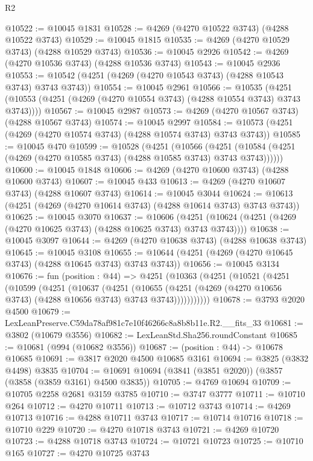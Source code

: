 \begin{lexlean}{R2}
\begin{coremodule}
@10522 := @10045 @1831
@10528 := @4269 (@4270 @10522 @3743) (@4288 @10522 @3743)
@10529 := @10045 @1815
@10535 := @4269 (@4270 @10529 @3743) (@4288 @10529 @3743)
@10536 := @10045 @2926
@10542 := @4269 (@4270 @10536 @3743) (@4288 @10536 @3743)
@10543 := @10045 @2936
@10553 := @10542 (@4251 (@4269 (@4270 @10543 @3743) (@4288 @10543 @3743) @3743 @3743))
@10554 := @10045 @2961
@10566 := @10535
    (@4251 (@10553 (@4251 (@4269 (@4270 @10554 @3743) (@4288 @10554 @3743) @3743 @3743))))
@10567 := @10045 @2987
@10573 := @4269 (@4270 @10567 @3743) (@4288 @10567 @3743)
@10574 := @10045 @2997
@10584 := @10573 (@4251 (@4269 (@4270 @10574 @3743) (@4288 @10574 @3743) @3743 @3743))
@10585 := @10045 @470
@10599 := @10528
    (@4251
      (@10566
        (@4251 (@10584 (@4251 (@4269 (@4270 @10585 @3743) (@4288 @10585 @3743) @3743 @3743))))))
@10600 := @10045 @1848
@10606 := @4269 (@4270 @10600 @3743) (@4288 @10600 @3743)
@10607 := @10045 @433
@10613 := @4269 (@4270 @10607 @3743) (@4288 @10607 @3743)
@10614 := @10045 @3044
@10624 := @10613 (@4251 (@4269 (@4270 @10614 @3743) (@4288 @10614 @3743) @3743 @3743))
@10625 := @10045 @3070
@10637 := @10606
    (@4251 (@10624 (@4251 (@4269 (@4270 @10625 @3743) (@4288 @10625 @3743) @3743 @3743))))
@10638 := @10045 @3097
@10644 := @4269 (@4270 @10638 @3743) (@4288 @10638 @3743)
@10645 := @10045 @3108
@10655 := @10644 (@4251 (@4269 (@4270 @10645 @3743) (@4288 @10645 @3743) @3743 @3743))
@10656 := @10045 @3134
@10676 := fun (position : @44) =>
  @4251
    (@10363
      (@4251
        (@10521
          (@4251
            (@10599
              (@4251
                (@10637
                  (@4251
                    (@10655
                      (@4251 (@4269 (@4270 @10656 @3743) (@4288 @10656 @3743) @3743 @3743)))))))))))
@10678 := @3793 @2020 @4500
@10679 := LexLeanPreserve.C59da78af981c7e10f46266c8a8b8b11e.R2.__fits_33
@10681 := @3802 (@10679 @3556)
@10682 := LexLeanStd.Sha256.roundConstant
@10685 := @10681 (@994 (@10682 @3556))
@10687 := (position : @44) -> @10678 @10685
@10691 := @3817 @2020 @4500 @10685 @3161
@10694 := @3825 (@3832 @4498) @3835
@10704 := @10691 @10694 (@3841 (@3851 @2020)) (@3857 (@3858 (@3859 @3161) @4500 @3835))
@10705 := @4769 @10694
@10709 := @10705 @2258 @2681 @3159 @3785
@10710 := @3747 @3777
@10711 := @10710 @264
@10712 := @4270 @10711
@10713 := @10712 @3743
@10714 := @4269 @10713
@10716 := @4288 @10711 @3743
@10717 := @10714 @10716
@10718 := @10710 @229
@10720 := @4270 @10718 @3743
@10721 := @4269 @10720
@10723 := @4288 @10718 @3743
@10724 := @10721 @10723
@10725 := @10710 @165
@10727 := @4270 @10725 @3743

\end{coremodule}
\end{lexlean}
